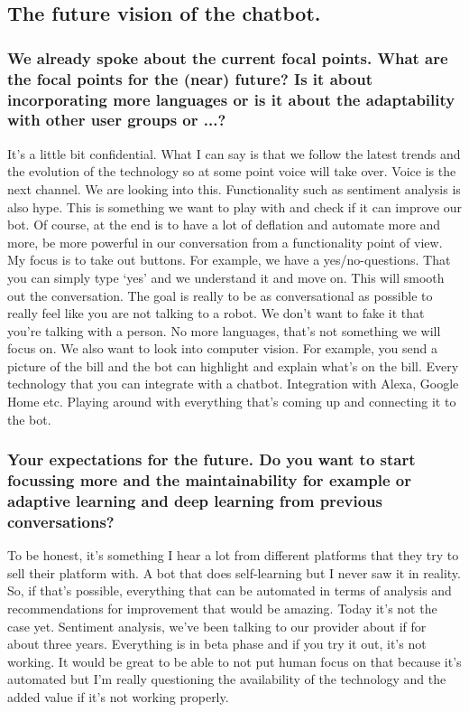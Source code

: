 \begin{appendices}
	\subsection{The future vision of the chatbot.}
	\subsubsection{We already spoke about the current focal points. What are the focal points for the (near) future? Is it about incorporating more languages or is it about the adaptability with other user groups or ...?}
	It’s a little bit confidential. What I can say is that we follow the latest trends and the evolution of the technology so at some point voice will take over. Voice is the next channel. We are looking into this. Functionality such as sentiment analysis is also hype. This is something we want to play with and check if it can improve our bot. Of course, at the end is to have a lot of deflation and automate more and more, be more powerful in our conversation from a functionality point of view. My focus is to take out buttons. For example, we have a yes/no-questions. That you can simply type ‘yes’ and we understand it and move on. This will smooth out the conversation. The goal is really to be as conversational as possible to really feel like you are not talking to a robot. We don’t want to fake it that you’re talking with a person. No more languages, that’s not something we will focus on. We also want to look into computer vision. For example, you send a picture of the bill and the bot can highlight and explain what’s on the bill. Every technology that you can integrate with a chatbot. Integration with Alexa, Google Home etc. Playing around with everything that’s coming up and connecting it to the bot.
	
	\subsubsection{Your expectations for the future. Do you want to start focussing more and the maintainability for example or adaptive learning and deep learning from previous conversations?}
	To be honest, it’s something I hear a lot from different platforms that they try to sell their platform with. A bot that does self-learning but I never saw it in reality. So, if that’s possible, everything that can be automated in terms of analysis and recommendations for improvement that would be amazing. Today it’s not the case yet. Sentiment analysis, we’ve been talking to our provider about if for about three years. Everything is in beta phase and if you try it out, it’s not working. It would be great to be able to not put human focus on that because it’s automated but I’m really questioning the availability of the technology and the added value if it’s not working properly.
	

\end{appendices}
